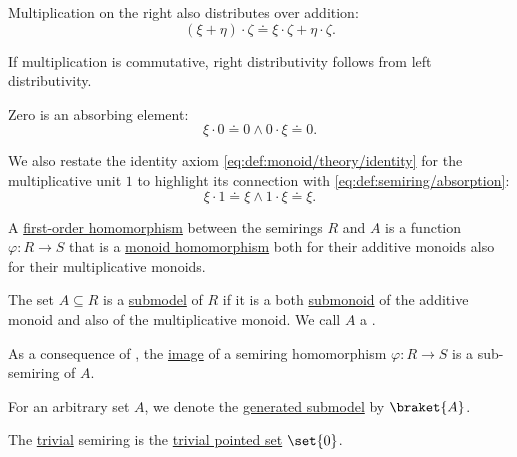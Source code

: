 \begin{definition}
\begin{thmenum}
\begin{thmenum}
       Multiplication on the right also distributes over addition:
      \begin{equation}\label{eq:def:semiring/right_distributivity}
        (\xi + \eta) \cdot \zeta \doteq \xi \cdot \zeta + \eta \cdot \zeta.
      \end{equation}

      If multiplication is commutative, right distributivity follows from left distributivity.

       Zero is an absorbing element:
      \begin{equation}\label{eq:def:semiring/absorption}
        \xi \cdot 0 \doteq 0 \wedge 0 \cdot \xi \doteq 0.
      \end{equation}

       We also restate the identity axiom \eqref{eq:def:monoid/theory/identity} for the multiplicative unit \( 1 \) to highlight its connection with \eqref{eq:def:semiring/absorption}:
      \begin{equation}\label{eq:def:semiring/identity}
        \xi \cdot 1 \doteq \xi \wedge 1 \cdot \xi \doteq \xi.
      \end{equation}
    \end{thmenum}

     A \hyperref[def:first_order_homomorphism]{first-order homomorphism} between the semirings \( R \) and \( A \) is a function \( \varphi: R \to S \) that is a \hyperref[def:monoid/homomorphism]{monoid homomorphism} both for their additive monoids also for their multiplicative monoids.

     The set \( A \subseteq R \) is a \hyperref[thm:substructure_is_model]{submodel} of \( R \) if it is a both \hyperref[def:monoid/submodel]{submonoid} of the additive monoid and also of the multiplicative monoid. We call \( A \) a .

    As a consequence of , the \hyperref[def:multi_valued_function/image]{image} of a semiring homomorphism \( \varphi: R \to S \) is a sub-semiring of \( A \).

    For an arbitrary set \( A \), we denote the \hyperref[def:first_order_generated_substructure]{generated submodel} by \( \braket{ A } \).

     The \hyperref[thm:substructures_form_complete_lattice/bottom]{trivial} semiring is the \hyperref[def:pointed_set/trivial]{trivial pointed set} \( \set{ 0 } \).


\end{thmenum}
\end{definition}
